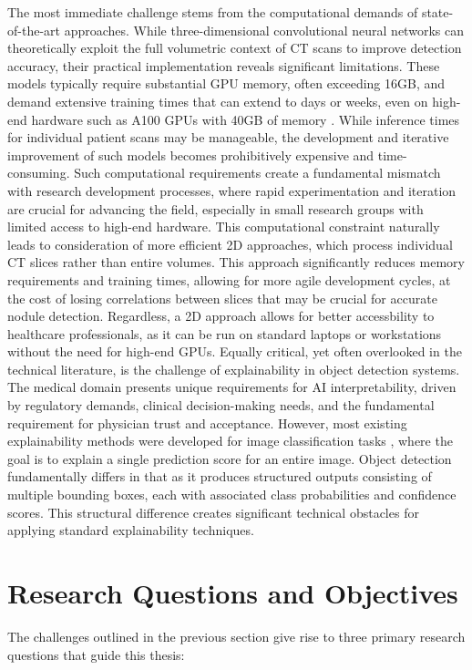 The most immediate challenge stems from the computational demands of state-of-the-art approaches. While three-dimensional convolutional neural networks can theoretically exploit the full volumetric context of CT scans to improve detection accuracy, their practical implementation reveals significant limitations. These models typically require substantial GPU memory, often exceeding 16GB, and demand extensive training times that can extend to days or weeks, even on high-end hardware such as A100 GPUs with 40GB of memory \cite{wu2018systematicanalysisstateoftheart3d}. While inference times for individual patient scans may be manageable, the development and iterative improvement of such models becomes prohibitively expensive and time-consuming. 
Such computational requirements create a fundamental mismatch with research development processes, where rapid experimentation and iteration are crucial for advancing the field, especially in small research groups with limited access to high-end hardware.
This computational constraint naturally leads to consideration of more efficient 2D approaches, which process individual CT slices rather than entire volumes. This approach significantly reduces memory requirements and training times, allowing for more agile development cycles, at the cost of losing correlations between slices that may be crucial for accurate nodule detection. Regardless, a 2D approach allows for better accessbility to healthcare professionals, as it can be run on standard laptops or workstations without the need for high-end GPUs.
Equally critical, yet often overlooked in the technical literature, is the challenge of explainability in object detection systems. The medical domain presents unique requirements for AI interpretability, driven by regulatory demands, clinical decision-making needs, and the fundamental requirement for physician trust and acceptance. However, most existing explainability methods were developed for image classification tasks \cite{selvaraju2019gradcam,chattopadhay_2018gradcam++,draelos2021hirescam,jiang2021layercam}, where the goal is to explain a single prediction score for an entire image. Object detection fundamentally differs in that as it produces structured outputs consisting of multiple bounding boxes, each with associated class probabilities and confidence scores.
This structural difference creates significant technical obstacles for applying standard explainability techniques.

\section{Research Questions and Objectives}
The challenges outlined in the previous section give rise to three primary research questions that guide this thesis:

